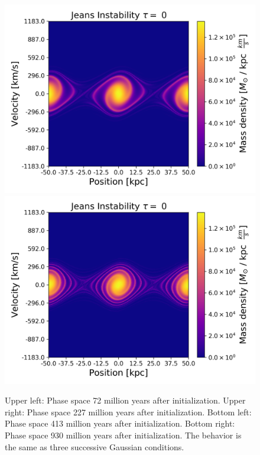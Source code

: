 \begin{figure}[h!]
    \includegraphics[scale=0.45]{imag/jeans40.png}
    \includegraphics[scale=0.45]{imag/jeans90.png}
    \caption{Upper left: Phase space 72 million years after initialization. Upper right: Phase space 227 million years after initialization. Bottom left: Phase space 413 million years after initialization. Bottom right: Phase space 930 million years after initialization. The behavior is the same as three successive Gaussian conditions.}
    \label{1dJeans}
\end{figure}

